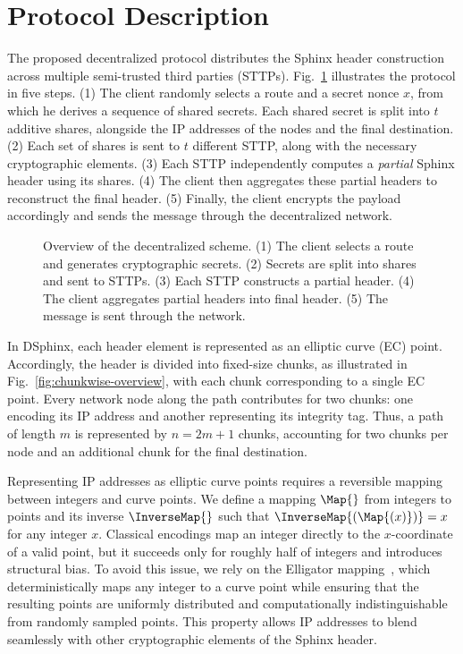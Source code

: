 \section{Protocol Description}\label{sec:scheme} 

The proposed decentralized protocol distributes the Sphinx header construction across multiple semi-trusted third parties (STTPs). 
Fig.~\ref{fig:overall_schema} illustrates the protocol in five steps.
(1) The client randomly selects a route and a secret nonce $x$, from which he derives a sequence of shared secrets.
Each shared secret is split into $t$ additive shares, alongside the IP addresses of the nodes and the final destination.
(2) Each set of shares is sent to $t$ different STTP, along with the necessary cryptographic elements.  
(3) Each STTP independently computes a \textit{partial} Sphinx header using its shares.  
(4) The client then aggregates these partial headers to reconstruct the final header. 
(5) Finally, the client encrypts the payload accordingly and sends the message through the decentralized network.

\begin{figure}%
    \centering
    \resizebox{\linewidth}{!}{}
    \caption{Overview of the decentralized scheme. 
    (1) The client selects a route and generates cryptographic secrets. 
    (2) Secrets are split into shares and sent to STTPs. 
    (3) Each STTP constructs a partial header. 
    (4) The client aggregates partial headers into final header. 
    (5) The message is sent through the network.}
    \label{fig:overall_schema}
\end{figure}

In DSphinx, each header element is represented as an elliptic curve (EC) point. 
Accordingly, the header is divided into fixed-size chunks, as illustrated in Fig.~\ref{fig:chunkwise-overview}, with each chunk corresponding to a single EC point. 
Every network node along the path contributes for two chunks: one encoding its IP address and another representing its integrity tag. 
Thus, a path of length $m$ is represented by $n = 2m + 1$ chunks, accounting for two chunks per node and an additional chunk for the final destination.

Representing IP addresses as elliptic curve points requires a reversible mapping between integers and curve points.  
We define a mapping $\Map{}$ from integers to points and its inverse $\InverseMap{}$ such that $\InverseMap{(\Map{(x)})} = x$ for any integer $x$.  
Classical encodings map an integer directly to the $x$-coordinate of a valid point, but it succeeds only for roughly half of integers and introduces structural bias. 
To avoid this issue, we rely on the Elligator mapping~\cite{bernstein2013elligator}, which deterministically maps any integer to a curve point while ensuring that the resulting points are uniformly distributed and computationally indistinguishable from randomly sampled points.  
This property allows IP addresses to blend seamlessly with other cryptographic elements of the Sphinx header.

